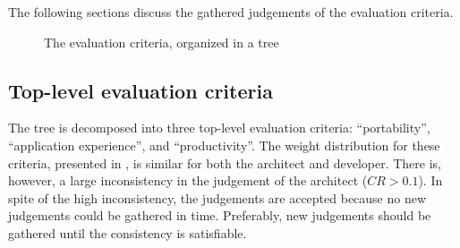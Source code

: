 The following sections discuss the gathered judgements of the evaluation criteria.

\begin{figure}[h!]
    \centering
    \begin{sideways}
    \end{sideways}
    \caption{The evaluation criteria, organized in a tree}
    \label{fig:criteriatree}
\end{figure}

\subsection{Top-level evaluation criteria}

The tree is decomposed into three top-level evaluation criteria: ``portability'', ``application experience'', and ``productivity''. The weight distribution for these criteria, presented in , is similar for both the architect and developer. There is, however, a large inconsistency in the judgement of the architect ($CR > 0.1$). In spite of the high inconsistency, the judgements are accepted because no new judgements could be gathered in time. Preferably, new judgements should be gathered until the consistency is satisfiable. 

